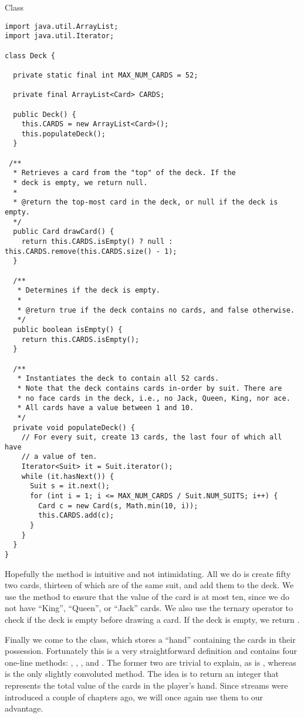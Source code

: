 \begin{cl}{ Class}
\begin{lstlisting}[language=MyJava]
import java.util.ArrayList;
import java.util.Iterator;

class Deck {

  private static final int MAX_NUM_CARDS = 52;

  private final ArrayList<Card> CARDS;

  public Deck() {
    this.CARDS = new ArrayList<Card>();
    this.populateDeck();
  }

 /**
  * Retrieves a card from the "top" of the deck. If the
  * deck is empty, we return null.
  *
  * @return the top-most card in the deck, or null if the deck is empty.
  */
  public Card drawCard() {
    return this.CARDS.isEmpty() ? null : this.CARDS.remove(this.CARDS.size() - 1);
  }

  /**
   * Determines if the deck is empty.
   *
   * @return true if the deck contains no cards, and false otherwise.
   */
  public boolean isEmpty() { 
    return this.CARDS.isEmpty(); 
  }

  /**
   * Instantiates the deck to contain all 52 cards.
   * Note that the deck contains cards in-order by suit. There are 
   * no face cards in the deck, i.e., no Jack, Queen, King, nor ace.
   * All cards have a value between 1 and 10.
   */
  private void populateDeck() {
    // For every suit, create 13 cards, the last four of which all have
    // a value of ten.
    Iterator<Suit> it = Suit.iterator();
    while (it.hasNext()) {
      Suit s = it.next();
      for (int i = 1; i <= MAX_NUM_CARDS / Suit.NUM_SUITS; i++) {
        Card c = new Card(s, Math.min(10, i));
        this.CARDS.add(c);
      }
    }
  }
}
\end{lstlisting}
\end{cl}

Hopefully the  method is intuitive and not intimidating. All we do is create fifty two cards, thirteen of which are of the same suit, and add them to the deck. We use the  method to ensure that the value of the card is at most ten, since we do not have ``King'', ``Queen'', or ``Jack'' cards. We also use the ternary operator to check if the deck is empty before drawing a card. If the deck is empty, we return .

Finally we come to the  class, which stores a ``hand'' containing the cards in their possession. Fortunately this is a very straightforward definition and contains four one-line methods: , , , and . The former two are trivial to explain, as is , whereas  is the only slightly convoluted method. The idea is to return an integer that represents the total value of the cards in the player's hand. Since streams were introduced a couple of chapters ago, we will once again use them to our advantage.

